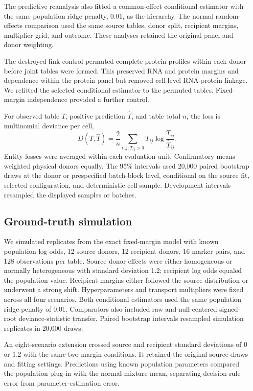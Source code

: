 \documentclass[pdflatex,sn-vancouver-num,iicol]{sn-jnl}
\begin{document}
The predictive reanalysis also fitted a common-effect conditional estimator with the same population ridge penalty, 0.01, as the hierarchy. The normal random-effects comparison used the same source tables, donor split, recipient margins, multiplier grid, and outcome. These analyses retained the original panel and donor weighting.

The destroyed-link control permuted complete protein profiles within each donor before joint tables were formed. This preserved RNA and protein margins and dependence within the protein panel but removed cell-level RNA-protein linkage. We refitted the selected conditional estimator to the permuted tables. Fixed-margin independence provided a further control.

For observed table $T$, positive prediction $\widehat T$, and table total $n$, the loss is multinomial deviance per cell,
\begin{equation}
  D(T,\widehat T)=\frac{2}{n}\sum_{i,j:T_{ij}>0}
  T_{ij}\log\frac{T_{ij}}{\widehat T_{ij}}.
  \label{eq:deviance}
\end{equation}
Entity losses were averaged within each evaluation unit. Confirmatory means weighted physical donors equally. The 95\% intervals used 20,000 paired bootstrap draws at the donor or prespecified batch-block level, conditional on the source fit, selected configuration, and deterministic cell sample. Development intervals resampled the displayed samples or batches.

\subsection{Ground-truth simulation}

We simulated \SimReps{} replicates from the exact fixed-margin model with known population log odds, 12 source donors, 12 recipient donors, 16 marker pairs, and 128 observations per table. Source donor effects were either homogeneous or normally heterogeneous with standard deviation 1.2; recipient log odds equaled the population value. Recipient margins either followed the source distribution or underwent a strong shift. Hyperparameters and transport multipliers were fixed across all four scenarios. Both conditional estimators used the same population ridge penalty of 0.01. Comparators also included raw and null-centered signed-root deviance-statistic transfer. Paired bootstrap intervals resampled simulation replicates in 20,000 draws.

An eight-scenario extension crossed source and recipient standard deviations of 0 or 1.2 with the same two margin conditions. It retained the original source draws and fitting settings. Predictions using known population parameters compared the population plug-in with the normal-mixture mean, separating decision-rule error from parameter-estimation error.
\end{document}
